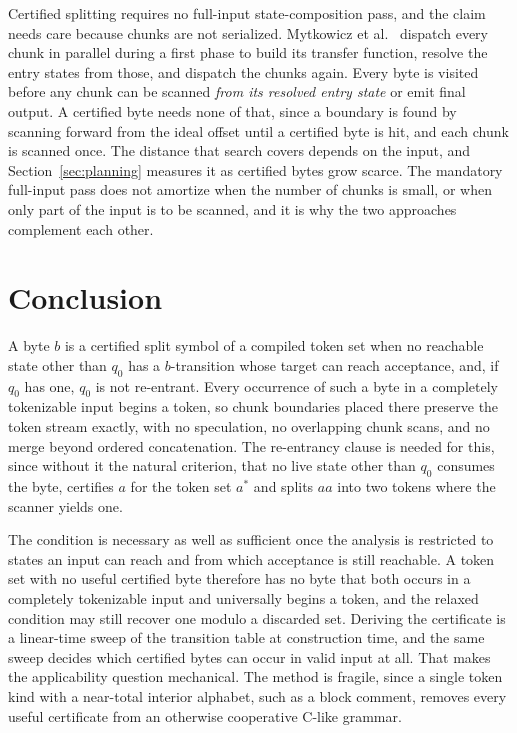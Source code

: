 \documentclass[11pt,a4paper]{article}
\theoremstyle{definition}
\theoremstyle{plain}
\begin{document}
Certified splitting requires no full-input state-composition pass, and the claim needs care because chunks are not
serialized. Mytkowicz et al.~\cite{mytkowicz2014dpfsm} dispatch every chunk in parallel during a first phase to build
its transfer function, resolve the entry states from those, and dispatch the chunks again. Every byte is visited before
any chunk can be scanned \emph{from its resolved entry state} or emit final output. A certified byte needs none of that,
since a boundary is found by scanning forward from the ideal offset until a certified byte is hit, and each chunk is
scanned once. The distance that search covers depends on the input, and Section~\ref{sec:planning} measures it as
certified bytes grow scarce. The mandatory full-input pass does not amortize when the number of chunks is small, or when
only part of the input is to be scanned, and it is why the two approaches complement each other.

\section{Conclusion}

A byte $b$ is a certified split symbol of a compiled token set when no reachable state other than $q_0$ has a
$b$-transition whose target can reach acceptance, and, if $q_0$ has one, $q_0$ is not re-entrant. Every occurrence of
such a byte in a completely tokenizable input begins a token, so chunk boundaries placed there preserve the token stream
exactly, with no speculation, no overlapping chunk scans, and no merge beyond ordered concatenation. The re-entrancy
clause is needed for this, since without it the natural criterion, that no live state other than $q_0$ consumes the
byte, certifies $a$ for the token set $a^*$ and splits $aa$ into two tokens where the scanner yields one.

The condition is necessary as well as sufficient once the analysis is restricted to states an input can reach and from
which acceptance is still reachable. A token set with no useful certified byte therefore has no byte that both occurs in
a completely tokenizable input and universally begins a token, and the relaxed condition may still recover one modulo a
discarded set. Deriving the certificate is a linear-time sweep of the transition table at construction time, and the
same sweep decides which certified bytes can occur in valid input at all. That makes the applicability question
mechanical. The method is fragile, since a single token kind with a near-total interior alphabet, such as a block
comment, removes every useful certificate from an otherwise cooperative C-like grammar.
\end{document}
